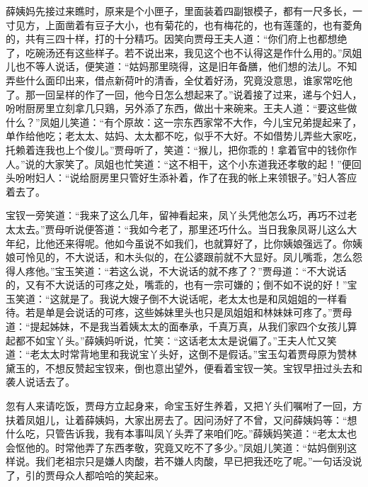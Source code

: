 \begin{parag}


    薛姨妈先接过来瞧时，原来是个小匣子，里面装着四副银模子，都有一尺多长，一寸见方，上面凿着有豆子大小，也有菊花的，也有梅花的，也有莲蓬的，也有菱角的，共有三四十样，打的十分精巧。因笑向贾母王夫人道：“你们府上也都想绝了，吃碗汤还有这些样子。若不说出来，我见这个也不认得这是作什么用的。”凤姐儿也不等人说话，便笑道：“姑妈那里晓得，这是旧年备膳，他们想的法儿。不知弄些什么面印出来，借点新荷叶的清香，全仗着好汤，究竟没意思，谁家常吃他了。那一回呈样的作了一回，他今日怎么想起来了。”说着接了过来，递与个妇人，吩咐厨房里立刻拿几只鶏，另外添了东西，做出十来碗来。王夫人道：“要这些做什么？”凤姐儿笑道：“有个原故：这一宗东西家常不大作，今儿宝兄弟提起来了，单作给他吃；老太太、姑妈、太太都不吃，似乎不大好。不如借势儿弄些大家吃，托赖着连我也上个俊儿。”贾母听了，笑道：“猴儿，把你乖的！拿着官中的钱你作人。”说的大家笑了。凤姐也忙笑道：“这不相干，这个小东道我还孝敬的起！”便回头吩咐妇人：“说给厨房里只管好生添补着，作了在我的帐上来领银子。”妇人答应着去了。
\end{parag}


\begin{parag}


    宝钗一旁笑道：“我来了这么几年，留神看起来，凤丫头凭他怎么巧，再巧不过老太太去。”贾母听说便答道：“我如今老了，那里还巧什么。当日我象凤哥儿这么大年纪，比他还来得呢。他如今虽说不如我们，也就算好了，比你姨娘强远了。你姨娘可怜见的，不大说话，和木头似的，在公婆跟前就不大显好。凤儿嘴乖，怎么怨得人疼他。”宝玉笑道：“若这么说，不大说话的就不疼了？”贾母道：“不大说话的，又有不大说话的可疼之处，嘴乖的，也有一宗可嫌的；倒不如不说的好！”宝玉笑道：“这就是了。我说大嫂子倒不大说话呢，老太太也是和凤姐姐的一样看待。若是单是会说话的可疼，这些姊妹里头也只是凤姐姐和林妹妹可疼了。”贾母道：“提起姊妹，不是我当着姨太太的面奉承，千真万真，从我们家四个女孩儿算起都不如宝丫头。”薛姨妈听说，忙笑：“这话老太太是说偏了。”王夫人忙又笑道：“老太太时常背地里和我说宝丫头好，这倒不是假话。”宝玉勾着贾母原为赞林黛玉的，不想反赞起宝钗来，倒也意出望外，便看着宝钗一笑。宝钗早扭过头去和袭人说话去了。
\end{parag}


\begin{parag}


    忽有人来请吃饭，贾母方立起身来，命宝玉好生养着，又把丫头们嘱咐了一回，方扶着凤姐儿，让着薛姨妈，大家出房去了。因问汤好了不曾，又问薛姨妈等：“想什么吃，只管告诉我，我有本事叫凤丫头弄了来咱们吃。”薛姨妈笑道：“老太太也会怄他的。时常他弄了东西孝敬，究竟又吃不了多少。”凤姐儿笑道：“姑妈倒别这样说。我们老祖宗只是嫌人肉酸，若不嫌人肉酸，早已把我还吃了呢。”一句话没说了，引的贾母众人都哈哈的笑起来。
\end{parag}



